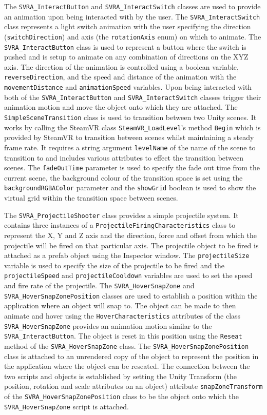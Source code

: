 \documentclass{l4proj}
\begin{document}
The \texttt{SVRA\_InteractButton} and \texttt{SVRA\_InteractSwitch} classes are used to provide an animation upon being interacted with by the user. The \texttt{SVRA\_InteractSwitch} class represents a light switch animation with the user specifying the direction (\texttt{switchDirection}) and axis (the \texttt{rotationAxis} enum) on which to animate. The \texttt{SVRA\_InteractButton} class is used to represent a button where the switch is pushed and is setup to animate on any combination of directions on the XYZ axis. The direction of the animation is controlled using a boolean variable, \texttt{reverseDirection}, and the speed and distance of the animation with the \texttt{movementDistance} and \texttt{animationSpeed} variables. Upon being interacted with both of the \texttt{SVRA\_InteractButton} and \texttt{SVRA\_InteractSwitch} classes trigger their animation motion and move the object onto which they are attached. The \texttt{SimpleSceneTransition} class is used to transition between two Unity scenes. It works by calling the SteamVR class \texttt{SteamVR\_LoadLevel}'s method \texttt{Begin} which is provided by SteamVR to transition between scenes whilst maintaining a steady frame rate. It requires a string argument \texttt{levelName} of the name of the scene to transition to and includes various attributes to effect the transition between scenes. The \texttt{fadeOutTime} parameter is used to specify the fade out time from the current scene, the background colour of the transition space is set using the \texttt{backgroundRGBAColor} parameter and the \texttt{showGrid} boolean is used to show the virtual grid within the transition space between scenes.

The \texttt{SVRA\_ProjectileShooter} class provides a simple projectile system. It contains three instances of a \texttt{ProjectileFiringCharacteristics} class to represent the X, Y and Z axis and the direction, force and offset from which the projectile will be fired on that particular axis. The projectile object to be fired is attached as a prefab object using the Inspector window. The \texttt{projectileSize} variable is used to specify the size of the projectile to be fired and the \texttt{projectileSpeed} and \texttt{projectileCooldown} variables are used to set the speed and fire rate of the projectile. The \texttt{SVRA\_HoverSnapZone} and \texttt{SVRA\_HoverSnapZonePosition} classes are used to establish a position within the application where an object will snap to. The object can be made to then animate and hover using the \texttt{HoverCharacteristics} attributes of the class \texttt{SVRA\_HoverSnapZone} provides an animation motion similar to the \texttt{SVRA\_InteractButton}. The object is reset in this position using the \texttt{Reseat} method of the \texttt{SVRA\_HoverSnapZone} class. The \texttt{SVRA\_HoverSnapZonePosition} class is attached to an unrendered copy of the object to represent the position in the application where the object can be reseated. The connection between the two scripts and objects is established by setting the Unity Transform (the position, rotation and scale attributes on an object) attribute \texttt{snapZoneTransform} of the \texttt{SVRA\_HoverSnapZonePosition} class to be the object onto which the \texttt{SVRA\_HoverSnapZone} script is attached.
\end{document}
